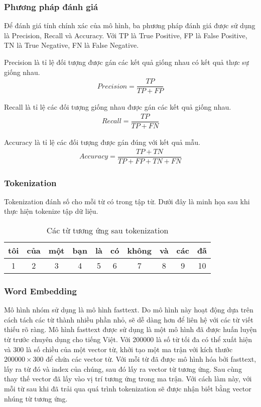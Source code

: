 \subsubsection{Phương pháp đánh giá}
Để đánh giá tính chính xác của mô hình, ba phương pháp đánh giá được sử dụng là Precision, Recall và Accuracy. Với TP là True Positive, FP là False Positive, TN là True Negative, FN là False Negative.

Precision là tỉ lệ đối tượng được gán các kết quả giống nhau có kết quả thực sự giống nhau.
\begin{align}
    Precision=\dfrac{TP}{TP+FP}
\end{align}

Recall là tỉ lệ các đối tượng giống nhau được gán các kết quả giống nhau.
\begin{align}
    Recall=\dfrac{TP}{TP+FN}
\end{align}

Accuracy là tỉ lệ các đối tượng được gán đúng với kết quả mẫu.
\begin{align}
    Accuracy=\dfrac{TP+TN}{TP+FP+TN+FN}
\end{align}

\subsubsection{Tokenization}
Tokenization đánh số cho mỗi từ có trong tập từ. Dưới đây là minh họa sau khi thực hiện tokenize
tập dữ liệu.
\begin{table}[htb]
    \centering
    \caption{Các từ tương ứng sau tokenization}
    \begin{tabularx}{0.95\textwidth}{C{1}|C{1}|C{1}|C{1}|C{1}|C{1}|C{1}|C{1}|C{1}|C{1}}
        \toprule
        tôi & của & một & bạn & là & có & không & và & các & đã \\   & 2   & 3   & 4   & 5  & 6  & 7     & 8  & 9   & 10 \\
        \bottomrule
    \end{tabularx}
\end{table}

\subsubsection{Word Embedding}
Mô hình nhóm sử dụng là mô hình fasttext. Do mô hình này hoạt động dựa trên cách tách các từ thành nhiều phần nhỏ, sẽ dễ dàng hơn để liên hệ với các từ viết thiếu rõ ràng. Mô hình fasttext được sử dụng là một mô hình đã được huấn luyện từ trước chuyên dụng cho tiếng Việt. Với 200000 là số từ tối đa có thể xuất hiện và 300 là số chiều của một vector từ, khởi tạo một ma trận với kích thước $200000\times300$ để chứa các vector từ. Với mỗi từ đã được mô hình hóa bởi fasttext, lấy ra từ đó và index của chúng, sau đó lấy ra vector từ tương ứng. Sau cùng thay thế vector đã lấy vào vị trí tương ứng trong ma trận. Với cách làm này, với mỗi từ sau khi đã trải qua quá trình tokenization sẽ được nhận biết bằng vector nhúng từ tương ứng.